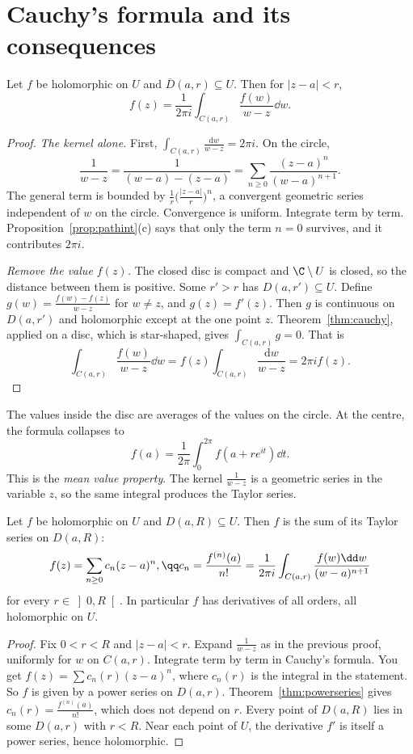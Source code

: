 \section{Cauchy's formula and its consequences}

\begin{theorem}\label{thm:cauchyformula}
Let $f$ be holomorphic on $U$ and $\overline D(a,r)\subseteq U$. Then for $|z-a|<r$,
\[
f(z)=\frac1{2\pi i}\int_{C(a,r)}\frac{f(w)}{w-z}\dd w.
\]
\end{theorem}
\begin{proof}
\textit{The kernel alone.} First, $\int_{C(a,r)}\frac{\mathrm dw}{w-z}=2\pi i$. On the circle,
\[
\frac1{w-z}=\frac1{(w-a)-(z-a)}=\sum_{n\ge0}\frac{(z-a)^n}{(w-a)^{n+1}}.
\]
The general term is bounded by $\frac1r\bigl(\frac{|z-a|}r\bigr)^n$, a convergent geometric series independent of $w$ on the circle. Convergence is uniform. Integrate term by term. Proposition~\ref{prop:pathint}(c) says that only the term $n=0$ survives, and it contributes $2\pi i$.

\textit{Remove the value $f(z)$.} The closed disc is compact and $\C\setminus U$ is closed, so the distance between them is positive. Some $r'>r$ has $D(a,r')\subseteq U$. Define $g(w)=\frac{f(w)-f(z)}{w-z}$ for $w\ne z$, and $g(z)=f'(z)$. Then $g$ is continuous on $D(a,r')$ and holomorphic except at the one point $z$. Theorem~\ref{thm:cauchy}, applied on a disc, which is star-shaped, gives $\int_{C(a,r)}g=0$. That is
\[
\int_{C(a,r)}\frac{f(w)}{w-z}\dd w=f(z)\int_{C(a,r)}\frac{\mathrm dw}{w-z}=2\pi if(z).
\]
\end{proof}

The values inside the disc are averages of the values on the circle. At the centre, the formula collapses to
\[
f(a)=\frac1{2\pi}\int_0^{2\pi}f(a+re^{it})\dd t.
\]
This is the \emph{mean value property}. The kernel $\frac1{w-z}$ is a geometric series in the variable $z$, so the same integral produces the Taylor series.

\begin{theorem}\label{thm:analytic}
Let $f$ be holomorphic on $U$ and $D(a,R)\subseteq U$. Then $f$ is the sum of its Taylor series on $D(a,R)$:
\[
\begin{gathered}f(z)=\sum_{n\ge0}c_n(z-a)^n,\qq c_n=\frac{f^{(n)}(a)}{n!}=\frac1{2\pi i}\int_{C(a,r)}\frac{f(w)\dd w}{(w-a)^{n+1}}\end{gathered}
\]
for every $r\in\left]0,R\right[$.
In particular $f$ has derivatives of all orders, all holomorphic on $U$.
\end{theorem}
\begin{proof}
Fix $0<r<R$ and $|z-a|<r$. Expand $\frac1{w-z}$ as in the previous proof, uniformly for $w$ on $C(a,r)$. Integrate term by term in Cauchy's formula. You get $f(z)=\sum c_n(r)(z-a)^n$, where $c_n(r)$ is the integral in the statement. So $f$ is given by a power series on $D(a,r)$. Theorem~\ref{thm:powerseries} gives $c_n(r)=\frac{f^{(n)}(a)}{n!}$, which does not depend on $r$. Every point of $D(a,R)$ lies in some $D(a,r)$ with $r<R$. Near each point of $U$, the derivative $f'$ is itself a power series, hence holomorphic.
\end{proof}

